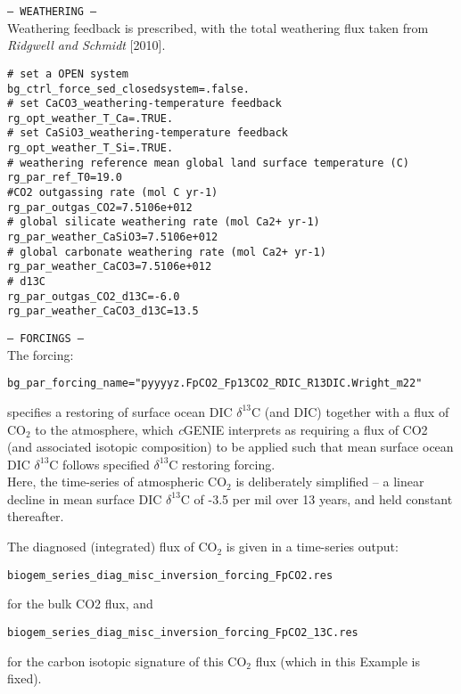 \documentclass[10pt,twoside]{article}
\begin{document}
\begin{compactitem}
        \item \texttt{--- WEATHERING ---}
        \\ Weathering feedback is prescribed, with the total weathering flux taken from \textit{Ridgwell and Schmidt} [2010].
        \vspace{-5pt}\begin{verbatim}
# set a OPEN system
bg_ctrl_force_sed_closedsystem=.false.
# set CaCO3_weathering-temperature feedback
rg_opt_weather_T_Ca=.TRUE.
# set CaSiO3_weathering-temperature feedback
rg_opt_weather_T_Si=.TRUE.
# weathering reference mean global land surface temperature (C)
rg_par_ref_T0=19.0
#CO2 outgassing rate (mol C yr-1)
rg_par_outgas_CO2=7.5106e+012
# global silicate weathering rate (mol Ca2+ yr-1)
rg_par_weather_CaSiO3=7.5106e+012
# global carbonate weathering rate (mol Ca2+ yr-1)
rg_par_weather_CaCO3=7.5106e+012
# d13C
rg_par_outgas_CO2_d13C=-6.0
rg_par_weather_CaCO3_d13C=13.5
        \end{verbatim}\vspace{-5pt}
        \item \texttt{--- FORCINGS ---}
        \\ The forcing:
        \vspace{-5pt}\begin{verbatim}
bg_par_forcing_name="pyyyyz.FpCO2_Fp13CO2_RDIC_R13DIC.Wright_m22"
        \end{verbatim}\vspace{-5pt}
         specifies a restoring of surface ocean DIC $\delta^{13}$C (and DIC) together with a flux of CO$_{2}$ to the atmosphere, which \textit{c}GENIE interprets as requiring a flux of CO2 (and associated isotopic composition) to be applied such that mean surface ocean DIC $\delta^{13}$C follows specified $\delta^{13}$C restoring forcing.
\\ Here, the time-series of atmospheric CO$_{2}$ is deliberately simplified -- a linear decline in mean surface DIC $\delta^{13}$C of -3.5 per mil over 13 years, and held constant thereafter.
        \end{compactitem}

The diagnosed (integrated) flux of CO$_{2}$ is given in a time-series output:
\vspace{-10pt}\begin{verbatim}
biogem_series_diag_misc_inversion_forcing_FpCO2.res
\end{verbatim}\vspace{-10pt}
for the bulk CO2 flux, and
\vspace{-10pt}\begin{verbatim}
biogem_series_diag_misc_inversion_forcing_FpCO2_13C.res
\end{verbatim}\vspace{-10pt}
for the carbon isotopic signature of this CO$_{2}$ flux (which in this Example is fixed).
\end{document}
